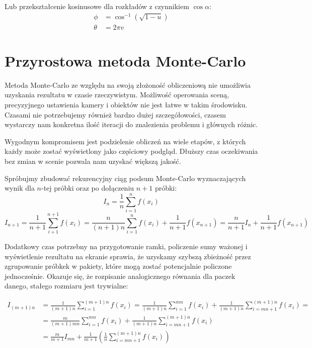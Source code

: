 \documentclass[../main.tex]{subfiles}
\begin{document}
Lub przekształcenie kosinusowe dla rozkładów z czynnikiem $\cos\alpha$:
\begin{align*}
  \phi &= \cos^{-1}(\sqrt{1-u}) \\
  \theta &= 2 \pi v
\end{align*}

\section{Przyrostowa metoda Monte-Carlo}

Metoda Monte-Carlo ze względu na swoją złożoność obliczeniową nie umożliwia
uzyskania rezultatu w czasie rzeczywistym. Możliwość operowania sceną,
precyzyjnego ustawienia kamery i obiektów nie jest łatwe w takim środowisku.
Czasami nie potrzebujemy również bardzo dużej szczegółowości, czasem wystarczy
nam konkretna ilość iteracji do znalezienia problemu i głównych różnic.

Wygodnym kompromisem jest podzielenie obliczeń na wiele etapów, z których każdy
może zostać wyświetlony jako częściowy podgląd. Dłuższy czas oczekiwania bez
zmian w scenie pozwala nam uzyskać większą jakość.

Spróbujmy zbudować rekurencyjny ciąg podsum Monte-Carlo wyznaczających wynik dla $n$-tej próbki oraz po dołączeniu $n+1$ próbki:
\[ 
I_n = \frac{1}{n} \sum_{i=1}^{n} f(x_i) 
\]
\[
I_{n+1} = \frac{1}{n+1} \sum_{i+1}^{n+1}f(x_i)
	= \frac{n}{(n+1)n} \sum_{i=1}^{n}f(x_i) + \frac{1}{n+1}f(x_{n+1})
	= \frac{n}{n+1} I_{n} + \frac{1}{n+1}f(x_{n+1})
\]

Dodatkowy czas potrzebny na przygotowanie ramki, policzenie sumy ważonej i
wyświetlenie rezultatu na ekranie sprawia, że uzyskamy szybszą zbieżność przez
zgrupowanie próbkek w pakiety, które mogą zostać potencjalnie policzone
jednocześnie. Okazuje się, że rozpisanie analogicznego równania dla paczek
danego, stałego rozmiaru jest trywialne:

\begin{align*}
  I_{(m+1)n} &= \frac{1}{(m+1)n} \sum_{i=1}^{(m+1)n} f(x_i)
  = \frac{1}{(m+1)n} \sum_{i=1}^{mn} f(x_i)
    + \frac{1}{(m+1)n} \sum_{i=mn+1}^{(m+1)n} f(x_i) = \\
  &= \frac{m}{(m+1)mn} \sum_{i=1}^{mn} f(x_i)
    + \frac{1}{(m+1)n} \sum_{i=mn+1}^{(m+1)n} f(x_i) \\
  &= \frac{m}{m+1}I_{mn}
    + \frac{1}{m+1} \left(
        \frac{1}{n} \sum_{i=mn+1}^{(m+1)n} f(x_i)
    \right)
\end{align*}
\end{document}
